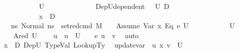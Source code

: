 \begin{isabellebody}
\ \ \ \ \ \ \ \ \ \ \ {\isachardoublequoteopen}U\ {\isasymnoteq}\ {\isacharbraceleft}{\kern0pt}{\isacharbraceright}{\kern0pt}{\isachardoublequoteclose}\ \isanewline
\ \ \ \ \ \ \ \ \ \ \ DepU{\isacharcolon}{\kern0pt}{\isachardoublequoteopen}dependent\ {\isasymLambda}\ {\isasymOmega}\ U\ D{\isachardoublequoteclose}\ \ \isanewline
\ \ \ \ \ \ \ \ \ \ \ {\isachardoublequoteopen}x\ {\isasymnotin}\ D{\isachardoublequoteclose}\ \ \ \ \ \ \ \ \ \ \ \isanewline
\ \ \ {\isachardoublequoteopen}{\isacharbraceleft}{\kern0pt}ns{\isacharprime}{\kern0pt}{\isachardot}{\kern0pt}\ Normal\ ns{\isacharprime}{\kern0pt}\ {\isasymin}\ {\isacharparenleft}{\kern0pt}set{\isacharunderscore}{\kern0pt}red{\isacharunderscore}{\kern0pt}cmd\ M\ {\isasymLambda}\ {\isasymGamma}\ {\isasymOmega}\ {\isacharparenleft}{\kern0pt}Assume\ {\isacharparenleft}{\kern0pt}{\isacharparenleft}{\kern0pt}Var\ x{\isacharparenright}{\kern0pt}\ {\isasymguillemotleft}Eq{\isasymguillemotright}\ e{}{\isacharparenright}{\kern0pt}{\isacharparenright}{\kern0pt}\ U{\isacharparenright}{\kern0pt}{\isacharbraceright}{\kern0pt}\ {\isasymnoteq}\ {\isacharbraceleft}{\kern0pt}{\isacharbraceright}{\kern0pt}{\isachardoublequoteclose}\isanewline
\ \ \ \ \ \ \ \ {\isacharparenleft}{\kern0pt}\ {\isachardoublequoteopen}{\isacharquery}{\kern0pt}U{\isacharprime}{\kern0pt}\ {\isasymnoteq}\ {\isacharbraceleft}{\kern0pt}{\isacharbraceright}{\kern0pt}{\isachardoublequoteclose}{\isacharparenright}{\kern0pt}\isanewline
%
\isadelimproof
%
\endisadelimproof
%
\isatagproof
{}\isamarkupfalse%
\ {\isacharminus}{\kern0pt}\isanewline
\ \ \isamarkupfalse%
\ Ared\ {\isacartoucheopen}U\ {\isasymnoteq}\ {\isacharbraceleft}{\kern0pt}{\isacharbraceright}{\kern0pt}{\isacartoucheclose}\ \isamarkupfalse%
\ u\ \ {\isachardoublequoteopen}u\ {\isasymin}\ U{\isachardoublequoteclose}\ \ {\isachardoublequoteopen}{\isasymLambda}{\isacharcomma}{\kern0pt}{\isasymGamma}{\isacharcomma}{\kern0pt}{\isasymOmega}\ {\isasymturnstile}\ {\isasymlangle}e{}{\isacharcomma}{\kern0pt}\ u{\isasymrangle}\ {\isasymDown}\ v{\isachardoublequoteclose}\ \isamarkupfalse%
\ auto\isanewline
\ \ \isamarkupfalse%
\ {\isacartoucheopen}x\ {\isasymnotin}\ D{\isacartoucheclose}\ DepU\ TypeVal\ LookupTy\ \isamarkupfalse%
\ {\isachardoublequoteopen}update{\isacharunderscore}{\kern0pt}var\ {\isasymLambda}\ u\ x\ v\ {\isasymin}\ U{\isachardoublequoteclose}\ \isamarkupfalse%

\end{isabellebody}
